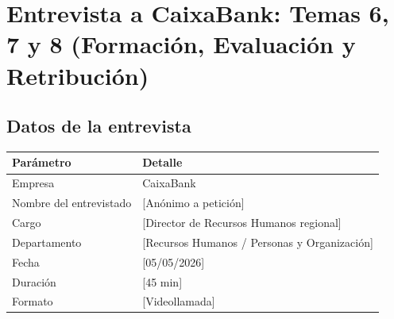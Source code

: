 %
%

\chapter{Entrevista a CaixaBank: Temas 6, 7 y 8 (Formación, Evaluación y Retribución)}

\section{Datos de la entrevista}

\begin{table}[H]
  \centering
  \begin{tabularx}{\textwidth}{lX}
    \toprule
    \textbf{Parámetro}       & \textbf{Detalle} \\
    \midrule
    Empresa                  & CaixaBank \\
    Nombre del entrevistado  & [Anónimo a petición] \\
    Cargo                    & [Director de Recursos Humanos regional] \\
    Departamento             & [Recursos Humanos / Personas y Organización] \\
    Fecha                    & [05/05/2026] \\
    Duración                 & [45 min] \\
    Formato                  & [Videollamada] \\
    \bottomrule
  \end{tabularx}
\end{table}

